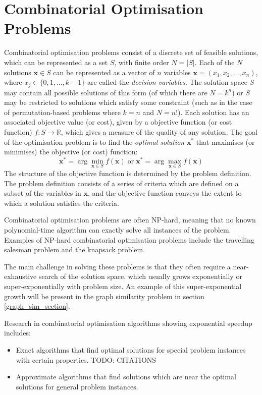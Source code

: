 \section{Combinatorial Optimisation Problems}\label{sec:cop}
Combinatorial optimisation problems consist of a discrete set of feasible solutions, which can be represented as a set $S$, with finite order $N=|S|$. Each of the $N$ solutions $\mathbf{x} \in S$ can be represented as a vector of $n$ variables $\mathbf{x}=(x_1, x_2,...,x_n)$, where $x_j\in\{0,1,...,k-1\}$ are called the \textit{decision variables}. The solution space $S$ may contain all possible solutions of this form (of which there are $N=k^n$) or $S$ may be restricted to solutions which satisfy some constraint (such as in the case of permutation-based problems where $k=n$ and $N=n!$). Each solution has an associated objective value (or cost), given by a objective function (or cost function) $f:S\rightarrow\mathbb{R}$, which gives a measure of the quality of any solution. The goal of the optimisation problem is to find the \textit{optimal solution} $\mathbf{x}^*$ that maximises (or minimises) the objective (or cost) function:
$$\mathbf{x}^* = \arg\min_{\mathbf{x} \in S} f(\mathbf{x})
\;\text{or}\;
\mathbf{x}^* = \arg\max_{\mathbf{x} \in S} f(\mathbf{x})$$
The structure of the objective function is determined by the problem definition. The problem definition consists of a series of criteria which are defined on a subset of the variables in $\mathbf{x}$, and the objective function conveys the extent to which a solution satisfies the criteria.

Combinatorial optimisation problems are often NP-hard, meaning that no known polynomial-time algorithm can exactly solve all instances of the problem. Examples of NP-hard combinatorial optimisation problems include the travelling salesman problem and the knapsack problem.

The main challenge in solving these problems is that they often require a near-exhaustive search of the solution space, which usually grows exponentially or super-exponentially with problem size. An example of this super-exponential growth will be present in the graph similarity problem in section \ref{graph_sim_section}.

Research in combinatorial optimisation algorithms showing exponential speedup includes:
\begin{itemize}
    \item Exact algorithms that find optimal solutions for special problem instances with certain properties. TODO: CITATIONS
    \item Approximate algorithms that find solutions which are near the optimal solutions for general problem instances.
\end{itemize}


